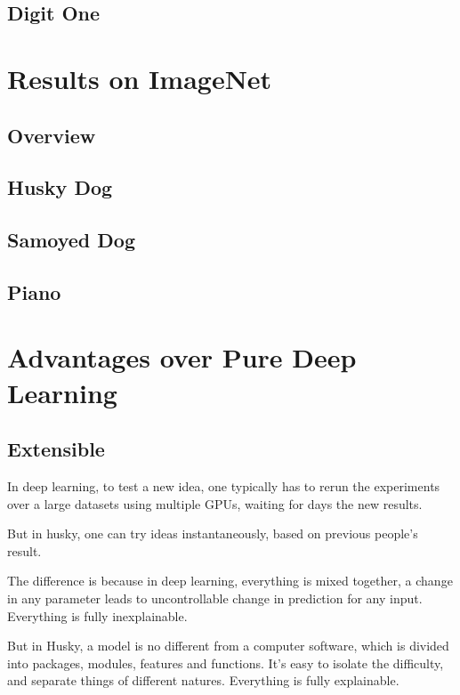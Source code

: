 \documentclass[11pt]{article} 	%
\theoremstyle{definition}
\begin{document}
\subsection{Digit One}


\section{Results on ImageNet}

\subsection{Overview}

\subsection{Husky Dog}

\subsection{Samoyed Dog}

\subsection{Piano}

\section{Advantages over Pure Deep Learning}

\subsection{Extensible}

In deep learning, to test a new idea, one typically has to rerun the experiments over a large datasets using multiple GPUs, waiting for days the new results.

But in husky, one can try ideas instantaneously, based on previous people's result.

The difference is because in deep learning, everything is mixed together, a change in any parameter leads to uncontrollable change in prediction for any input. Everything is fully inexplainable.

But in Husky, a model is no different from a computer software, which is divided into packages, modules, features and functions. It's easy to isolate the difficulty, and separate things of different natures. Everything is fully explainable.
\end{document}
